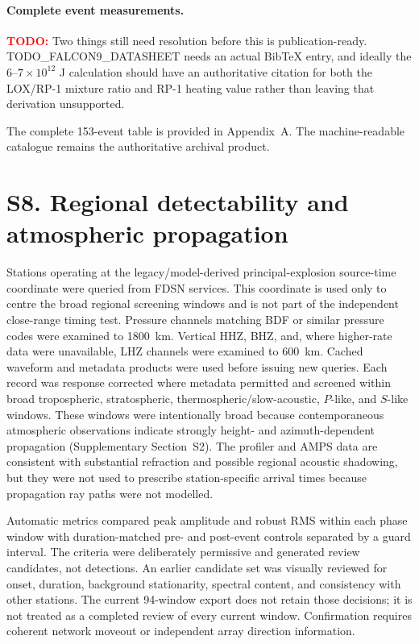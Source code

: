 \documentclass[]{seismica}
\newcommand{\todo}[1]{%
  \par\noindent
  \colorbox{yellow!40}{%
    \parbox{0.96\linewidth}{%
      \textbf{\textcolor{red}{TODO:}} #1
    }%
  }%
  \par
}
\begin{document}
\paragraph{Complete event measurements.}

\todo{Two things still need resolution before this is publication-ready. TODO\_FALCON9\_DATASHEET needs an actual BibTeX entry, and ideally the \(6\)–\(7\times10^{12}\) J calculation should have an authoritative citation for both the LOX/RP-1 mixture ratio and RP-1 heating value rather than leaving that derivation unsupported.}

The complete 153-event table is provided in Appendix~A. The machine-readable
catalogue remains the authoritative archival product.


\section*{S8. Regional detectability and atmospheric propagation}
\label{sec:supp_regional}

Stations operating at the legacy/model-derived principal-explosion source-time coordinate were queried from
FDSN services. This coordinate is used only to centre the broad regional screening windows and is not part of the independent close-range timing test. Pressure channels matching BDF or similar pressure codes were
examined to 1800~km. Vertical HHZ, BHZ, and, where higher-rate data were
unavailable, LHZ channels were examined to 600~km. Cached waveform and metadata
products were used before issuing new queries. Each record was response
corrected where metadata permitted and screened within broad tropospheric,
stratospheric, thermospheric/slow-acoustic, $P$-like, and $S$-like windows.
These windows were intentionally broad because contemporaneous atmospheric
observations indicate strongly height- and azimuth-dependent propagation
(Supplementary Section~S2). The profiler and AMPS data are consistent with
substantial refraction and possible regional acoustic shadowing, but they were
not used to prescribe station-specific arrival times because propagation ray
paths were not modelled.

Automatic metrics compared peak amplitude and robust RMS within each phase
window with duration-matched pre- and post-event controls separated by a guard
interval. The criteria were deliberately permissive and generated review
candidates, not detections. An earlier candidate set was visually reviewed for onset, duration, background
stationarity, spectral content, and consistency with other stations. The current
94-window export does not retain those decisions; it is not treated as a
completed review of every current window. Confirmation requires coherent network
moveout or independent array direction information.
\end{document}
